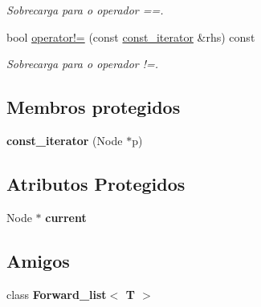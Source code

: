 \begin{DoxyCompactItemize}
\begin{DoxyCompactList}\small\item\em Sobrecarga para o operador ==. \end{DoxyCompactList}\item 
bool \hyperlink{class_forward__list_1_1const__iterator_a62c1263d95548e948bd232b41dbf3ab9}{operator!=} (const \hyperlink{class_forward__list_1_1const__iterator}{const\+\_\+iterator} \&rhs) const \hypertarget{class_forward__list_1_1const__iterator_a62c1263d95548e948bd232b41dbf3ab9}{}\label{class_forward__list_1_1const__iterator_a62c1263d95548e948bd232b41dbf3ab9}

\begin{DoxyCompactList}\small\item\em Sobrecarga para o operador !=. \end{DoxyCompactList}\end{DoxyCompactItemize}
\subsection*{Membros protegidos}
\begin{DoxyCompactItemize}
\item 
{\bfseries const\+\_\+iterator} (Node $\ast$p)\hypertarget{class_forward__list_1_1const__iterator_a4c804c58f5414d331e53ae14801fc4e3}{}\label{class_forward__list_1_1const__iterator_a4c804c58f5414d331e53ae14801fc4e3}

\end{DoxyCompactItemize}
\subsection*{Atributos Protegidos}
\begin{DoxyCompactItemize}
\item 
Node $\ast$ {\bfseries current}\hypertarget{class_forward__list_1_1const__iterator_a78f2dc73c3162a872fe473639ff9727e}{}\label{class_forward__list_1_1const__iterator_a78f2dc73c3162a872fe473639ff9727e}

\end{DoxyCompactItemize}
\subsection*{Amigos}
\begin{DoxyCompactItemize}
\item 
class {\bfseries Forward\+\_\+list$<$ T $>$}\hypertarget{class_forward__list_1_1const__iterator_a3248a6782762842dd0d50fa2ff16e968}{}\label{class_forward__list_1_1const__iterator_a3248a6782762842dd0d50fa2ff16e968}

\end{DoxyCompactItemize}


